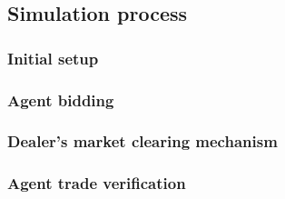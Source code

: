 \subsection{Simulation process}

\subsubsection{Initial setup}

\subsubsection{Agent bidding}

\subsubsection{Dealer's market clearing mechanism}

\subsubsection{Agent trade verification}